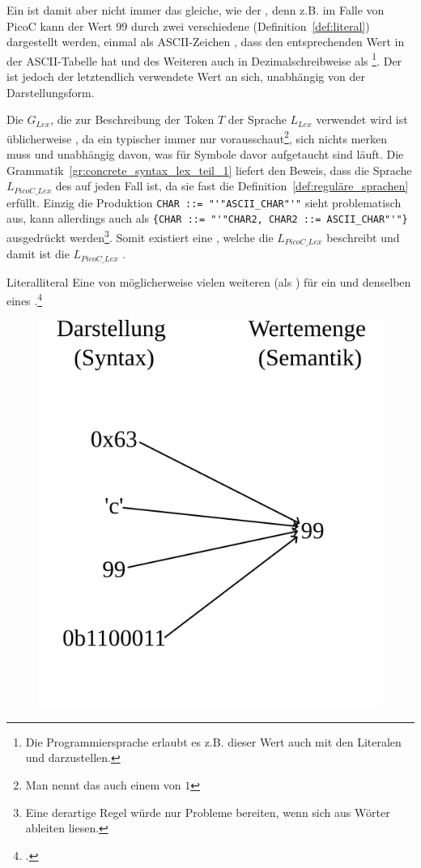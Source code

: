 Ein  ist damit aber nicht immer das gleiche, wie der , denn z.B. im Falle von PicoC kann der Wert $99$ durch zwei verschiedene  (Definition~\ref{def:literal}) dargestellt werden, einmal als ASCII-Zeichen , dass den entsprechenden Wert in der ASCII-Tabelle hat und des Weiteren auch in Dezimalschreibweise als \footnote{Die Programmiersprache  erlaubt es z.B. dieser Wert auch mit den Literalen  und  darzustellen.}. Der  ist jedoch der letztendlich verwendete Wert an sich, unabhängig von der Darstellungsform.

Die  $G_{Lex}$, die zur Beschreibung der Token $T$ der Sprache $L_{Lex}$ verwendet wird ist üblicherweise , da ein typischer  immer nur  vorausschaut\footnote{Man nennt das auch einem  von $1$}, sich nichts merken muss und unabhängig davon, was für Symbole davor aufgetaucht sind läuft. Die Grammatik~\ref{gr:concrete_syntax_lex_teil_1} liefert den Beweis, dass die Sprache $L_{PicoC\_Lex}$ des  auf jeden Fall  ist, da sie fast die Definition~\ref{def:reguläre_sprachen} erfüllt. Einzig die Produktion \verb|CHAR ::= "'"ASCII_CHAR"'"| sieht problematisch aus, kann allerdings auch als \verb|{CHAR ::= "'"CHAR2, CHAR2 ::= ASCII_CHAR"'"}|  ausgedrückt werden\footnote{Eine derartige Regel würde nur Probleme bereiten, wenn sich aus   Wörter ableiten liesen.}. Somit existiert eine , welche die  $L_{PicoC\_Lex}$ beschreibt und damit ist die  $L_{PicoC\_Lex}$ .

\begin{Definition}{Literal}{literal}
  Eine von möglicherweise vielen weiteren  (als ) für ein und denselben  eines .\footcite{thiemann_einfuhrung_2018}
  \begin{figure}[H]
    \centering
    \includegraphics[width=0.33\linewidth]{./figures/literal.png}
  \end{figure}
\end{Definition}

